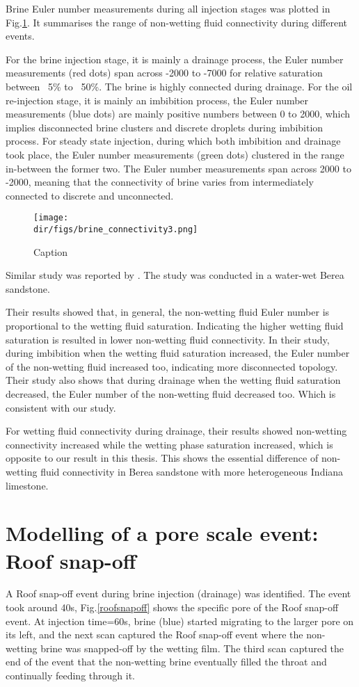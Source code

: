 Brine Euler number measurements during all injection stages was plotted in Fig.\ref{brine_connectivity3}. It summarises the range of non-wetting fluid connectivity during different events. 

For the brine injection stage, it is mainly a drainage process, the Euler number measurements (red dots) span across -2000 to -7000 for relative saturation between ~5\% to ~50\%. The brine is highly connected during drainage. For the oil re-injection stage, it is mainly an imbibition process, the Euler number measurements (blue dots) are mainly positive numbers between 0 to 2000, which implies disconnected brine clusters and discrete droplets during imbibition process. For steady state injection, during which both imbibition and drainage took place, the Euler number measurements (green dots) clustered in the range in-between the former two. The Euler number measurements span across 2000 to -2000, meaning that the connectivity of brine varies from intermediately connected to discrete and unconnected.

\begin{figure}
    \centering
    \texttt{[image: \\dir/figs/brine\_connectivity3.png]}
    \caption{Caption}   
    \label{brine_connectivity3}
\end{figure}

Similar study was reported by \citet{khanamiri2018fluid}. The study was conducted in a water-wet Berea sandstone. 

Their results showed that, in general, the non-wetting fluid Euler number is proportional to the wetting fluid saturation. Indicating the higher wetting fluid saturation is resulted in lower non-wetting fluid connectivity. In their study, during imbibition when the wetting fluid saturation increased, the Euler number of the non-wetting fluid increased too, indicating more disconnected topology. Their study also shows that during drainage when the wetting fluid saturation decreased, the Euler number of the non-wetting fluid decreased too. Which is consistent with our study.

For wetting fluid connectivity during drainage, their results showed non-wetting connectivity increased while the wetting phase saturation increased, which is opposite to our result in this thesis. This shows the essential difference of non-wetting fluid connectivity in Berea sandstone with more heterogeneous Indiana limestone.
 
\section{Modelling of a pore scale event: Roof snap-off}\label{modelling}
A Roof snap-off event during brine injection (drainage) was identified. The event took around 40s, Fig.\ref{roofsnapoff} shows the specific pore of the Roof snap-off event. At injection time=60s, brine (blue) started migrating to the larger pore on its left, and the next scan captured the Roof snap-off event where the non-wetting brine was snapped-off by the wetting film. The third scan captured the end of the event that the non-wetting brine eventually filled the throat and continually feeding through it.

